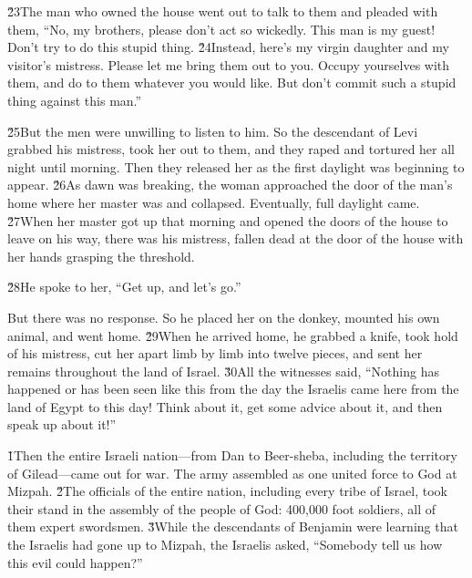 \v{23}The man who owned the house went out to talk to them and pleaded with them, ``No, my brothers, please don't act so wickedly. This man is my guest! Don't try to do this stupid thing. \v{24}Instead, here's my virgin daughter and my visitor's mistress. Please let me bring them out to you. Occupy yourselves with them, and do to them whatever you would like. But don't commit such a stupid thing against this man.''

\v{25}But the men were unwilling to listen to him. So the descendant of Levi grabbed his mistress, took her out to them, and they raped and tortured her all night until morning. Then they released her as the first daylight was beginning to appear. \v{26}As dawn was breaking, the woman approached the door of the man's home where her master was and collapsed. Eventually, full daylight came. \v{27}When her master got up that morning and opened the doors of the house to leave on his way, there was his mistress, fallen dead at the door of the house with her hands grasping the threshold.

\v{28}He spoke to her, ``Get up, and let's go.''

But there was no response. So he placed her on the donkey, mounted his own animal, and went home. \v{29}When he arrived home, he grabbed a knife, took hold of his mistress, cut her apart limb by limb into twelve pieces, and sent her remains throughout the land of Israel. \v{30}All the witnesses said, ``Nothing has happened or has been seen like this from the day the Israelis came here from the land of Egypt to this day! Think about it, get some advice about it, and then speak up about it!''

\v{1}Then the entire Israeli nation---from Dan to Beer-sheba, including the territory of Gilead---came out for war. The army assembled as one united force to God at Mizpah. \v{2}The officials of the entire nation, including every tribe of Israel, took their stand in the assembly of the people of God: 400,000 foot soldiers, all of them expert swordsmen. \v{3}While the descendants of Benjamin were learning that the Israelis had gone up to Mizpah, the Israelis asked, ``Somebody tell us how this evil could happen?''


